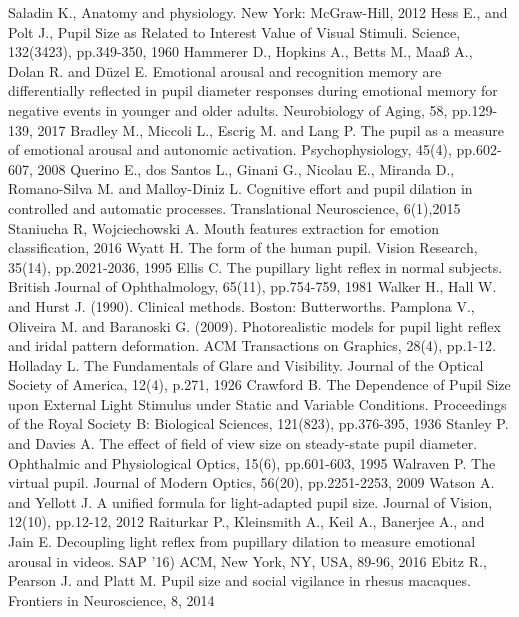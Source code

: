 \documentclass[USenglish,twocolumn]{article}
\begin{document}
\begin{thebibliography}{99}
Saladin K.,  Anatomy and physiology. New York: McGraw-Hill, 2012
Hess E., and Polt J.,  Pupil Size as Related to Interest Value of Visual Stimuli. Science, 132(3423), pp.349-350, 1960
Hammerer D., Hopkins A., Betts M., Maaß A., Dolan R. and Düzel E. Emotional arousal and recognition memory are differentially reflected in pupil diameter responses during emotional memory for negative events in younger and older adults. Neurobiology of Aging, 58, pp.129-139, 2017
Bradley M., Miccoli L., Escrig M. and Lang P. The pupil as a measure of emotional arousal and autonomic activation. Psychophysiology, 45(4), pp.602-607, 2008
Querino E., dos Santos L., Ginani G., Nicolau E., Miranda D., Romano-Silva M. and Malloy-Diniz L. Cognitive effort and pupil dilation in controlled and automatic processes. Translational Neuroscience, 6(1),2015
Staniucha R, Wojciechowski A. Mouth features extraction for emotion classification, 2016
Wyatt H. The form of the human pupil. Vision Research, 35(14), pp.2021-2036, 1995
Ellis C. The pupillary light reflex in normal subjects. British Journal of Ophthalmology, 65(11), pp.754-759, 1981
Walker H., Hall W. and Hurst J. (1990). Clinical methods. Boston: Butterworths.
Pamplona V., Oliveira M. and Baranoski G. (2009). Photorealistic models for pupil light reflex and iridal pattern deformation. ACM Transactions on Graphics, 28(4), pp.1-12.
Holladay L. The Fundamentals of Glare and Visibility. Journal of the Optical Society of America, 12(4), p.271, 1926
Crawford B. The Dependence of Pupil Size upon External Light Stimulus under Static and Variable Conditions. Proceedings of the Royal Society B: Biological Sciences, 121(823), pp.376-395, 1936
Stanley P. and Davies A. The effect of field of view size on steady-state pupil diameter. Ophthalmic and Physiological Optics, 15(6), pp.601-603, 1995
Walraven P. The virtual pupil. Journal of Modern Optics, 56(20), pp.2251-2253, 2009
Watson A. and Yellott J. A unified formula for light-adapted pupil size. Journal of Vision, 12(10), pp.12-12, 2012
Raiturkar P., Kleinsmith  A., Keil A., Banerjee A., and Jain E. Decoupling light reflex from pupillary dilation to measure emotional arousal in videos. SAP '16) ACM, New York, NY, USA, 89-96,  2016
Ebitz R., Pearson J. and Platt M. Pupil size and social vigilance in rhesus macaques. Frontiers in Neuroscience, 8, 2014

\end{thebibliography}
\end{document}
